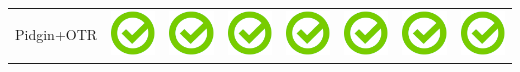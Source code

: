 \documentclass[10pt,foldmark,tumble]{leaflet}
\begin{document}
{{\begin{tabular}{ L{2cm} | C{2cm} | C{2cm} | C{2cm} | C{2cm} | C{2cm} | C{2cm} | C{2cm} | }
Pidgin+OTR & \includegraphics[scale=0.1]{pics/haken.png} & \includegraphics[scale=0.1]{pics/haken.png} & \includegraphics[scale=0.1]{pics/haken.png} & \includegraphics[scale=0.1]{pics/haken.png} & \includegraphics[scale=0.1]{pics/haken.png} & \includegraphics[scale=0.1]{pics/haken.png} & \includegraphics[scale=0.1]{pics/haken.png} \tabularnewline

\end{tabular}}}
\end{document}
